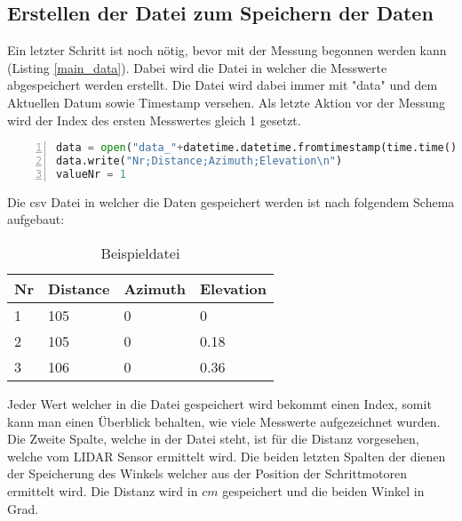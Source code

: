 \subsection{Erstellen der Datei zum Speichern der Daten}
Ein letzter Schritt ist noch nötig, bevor mit der Messung begonnen werden kann (Listing \ref{main_data}). Dabei wird die Datei in welcher die Messwerte abgespeichert werden erstellt. Die Datei wird dabei immer mit "data" und dem Aktuellen Datum sowie Timestamp versehen. Als letzte Aktion vor der Messung wird der Index des ersten Messwertes gleich 1 gesetzt.\\
\begin{lstlisting}[caption={Erstellen der Datei zum Speichern der Daten}, language={Python}, label={main_data}, numbers=left]
data = open("data_"+datetime.datetime.fromtimestamp(time.time()).strftime('%Y-%m-%d_%H-%M-%S')+".csv", "w")
data.write("Nr;Distance;Azimuth;Elevation\n")
valueNr = 1
\end{lstlisting}
Die \ac{csv} Datei in welcher die Daten gespeichert werden ist nach folgendem Schema aufgebaut:
\begin{table}[H]
	\centering
	\caption{Beispieldatei}
	\begin{tabular}{l|l|l|l}
		Nr & Distance & Azimuth & Elevation \\
		\hline
		1  & 105      & 0       & 0         \\
		2  & 105      & 0       & 0.18      \\
		3  & 106      & 0       & 0.36        
	\end{tabular}
\end{table}
Jeder Wert welcher in die Datei gespeichert wird bekommt einen Index, somit kann man einen Überblick behalten, wie viele Messwerte aufgezeichnet wurden. Die Zweite Spalte, welche in der Datei steht, ist für die Distanz vorgesehen, welche vom \ac{LIDAR} Sensor ermittelt wird. Die beiden letzten Spalten der dienen der Speicherung des Winkels welcher aus der Position der Schrittmotoren ermittelt wird. Die Distanz wird in $cm$ gespeichert und die beiden Winkel in Grad.

